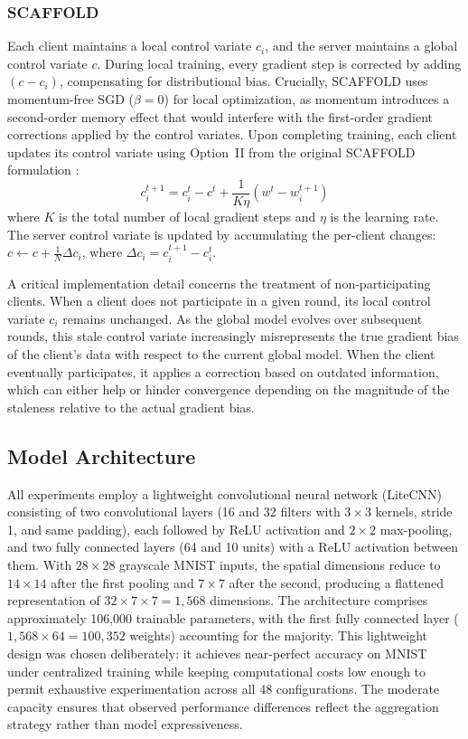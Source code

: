 \documentclass[conference]{IEEEtran}
\begin{document}
\subsubsection{SCAFFOLD} Each client maintains a local control variate $c_i$, and the server maintains a global control variate $c$. During local training, every gradient step is corrected by adding $(c - c_i)$, compensating for distributional bias. Crucially, SCAFFOLD uses momentum-free SGD ($\beta = 0$) for local optimization, as momentum introduces a second-order memory effect that would interfere with the first-order gradient corrections applied by the control variates. Upon completing training, each client updates its control variate using Option~II from the original SCAFFOLD formulation \cite{karimireddy2020scaffold}:
\begin{equation}
    c_i^{t+1} = c_i^t - c^t + \frac{1}{K\eta}(w^t - w_i^{t+1})
\end{equation}
where $K$ is the total number of local gradient steps and $\eta$ is the learning rate. The server control variate is updated by accumulating the per-client changes: $c \leftarrow c + \frac{1}{N}\Delta c_i$, where $\Delta c_i = c_i^{t+1} - c_i^t$.

A critical implementation detail concerns the treatment of non-participating clients. When a client does not participate in a given round, its local control variate $c_i$ remains unchanged. As the global model evolves over subsequent rounds, this stale control variate increasingly misrepresents the true gradient bias of the client's data with respect to the current global model. When the client eventually participates, it applies a correction based on outdated information, which can either help or hinder convergence depending on the magnitude of the staleness relative to the actual gradient bias.

\subsection{Model Architecture}

All experiments employ a lightweight convolutional neural network (LiteCNN) consisting of two convolutional layers (16 and 32 filters with $3 \times 3$ kernels, stride 1, and same padding), each followed by ReLU activation and $2 \times 2$ max-pooling, and two fully connected layers (64 and 10 units) with a ReLU activation between them. With $28 \times 28$ grayscale MNIST inputs, the spatial dimensions reduce to $14 \times 14$ after the first pooling and $7 \times 7$ after the second, producing a flattened representation of $32 \times 7 \times 7 = 1{,}568$ dimensions. The architecture comprises approximately 106,000 trainable parameters, with the first fully connected layer ($1{,}568 \times 64 = 100{,}352$ weights) accounting for the majority. This lightweight design was chosen deliberately: it achieves near-perfect accuracy on MNIST under centralized training while keeping computational costs low enough to permit exhaustive experimentation across all 48 configurations. The moderate capacity ensures that observed performance differences reflect the aggregation strategy rather than model expressiveness.
\end{document}

